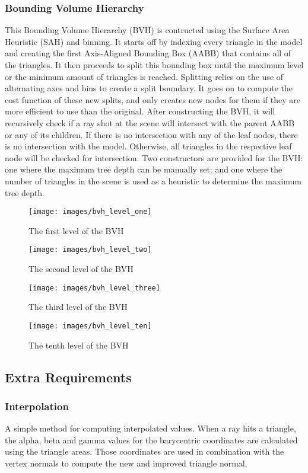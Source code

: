 \documentclass{article}
\begin{document}
    \subsubsection{Bounding Volume Hierarchy}
    This Bounding Volume Hierarchy (BVH) is contructed using the Surface Area Heuristic (SAH) and binning. 
    It starts off by indexing every triangle in the model and creating the first Axis-Aligned Bounding Box 
    (AABB) that contains all of the triangles. It then proceeds to split this bounding box until the maximum 
    level or the minimum amount of triangles is reached. Splitting relies on the use of alternating axes and 
    bins to create a split boundary. It goes on to compute the cost function of these new splits, and only 
    creates new nodes for them if they are more efficient to use than the original. After constructing the 
    BVH, it will recursively check if a ray shot at the scene will intersect with the parent AABB or any of 
    its children. If there is no intersection with any of the leaf nodes, there is no intersection with the 
    model. Otherwise, all triangles in the respective leaf node will be checked for intersection.
    Two constructors are provided for the BVH: one where the maximum tree depth can be manually set;
    and one where the number of triangles in the scene is used as a heuristic to determine the maximum
    tree depth.

    \begin{figure}[!htb]
          \texttt{[image: images/bvh\_level\_one]}
          \caption*{The first level of the BVH}
        \endminipage\hfill
          \texttt{[image: images/bvh\_level\_two]}
          \caption*{The second level of the BVH}
        \endminipage
        \newline
          \texttt{[image: images/bvh\_level\_three]}
          \caption*{The third level of the BVH}
        \endminipage\hfill
          \texttt{[image: images/bvh\_level\_ten]}
          \caption*{The tenth level of the BVH}
        \endminipage
    \end{figure}

    \subsection{Extra Requirements}
    \subsubsection{Interpolation}
    A simple method for computing interpolated values. When a ray hits a triangle, the alpha, beta and gamma 
    values for the barycentric coordinates are calculated using the triangle areas. Those coordinates are 
    used in combination with the vertex normals to compute the new and improved triangle normal.
\end{document}
